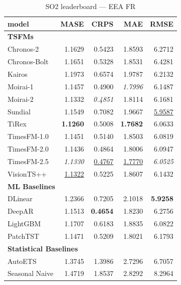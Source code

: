 \begin{table}[H]
\caption{SO2 leaderboard --- EEA FR}
\centering
\begin{small}
\begin{tabular}{lrrrr}
\toprule
model & MASE & CRPS & MAE & RMSE \\
\midrule
\multicolumn{5}{l}{\textbf{TSFMs}} \\
Chronos-2 & 1.1629 & 0.5423 & 1.8593 & 6.2712 \\
Chronos-Bolt & 1.1651 & 0.5328 & 1.8531 & 6.4281 \\
Kairos & 1.1973 & 0.6574 & 1.9787 & 6.2132 \\
Moirai-1 & 1.1457 & 0.4900 & \textit{1.7996} & 6.1487 \\
Moirai-2 & 1.1332 & \textit{0.4851} & 1.8114 & 6.1681 \\
Sundial & 1.1549 & 0.7082 & 1.9667 & \underline{5.9587} \\
TiRex & \textbf{1.1260} & 0.5008 & \textbf{1.7682} & 6.0633 \\
TimesFM-1.0 & 1.1451 & 0.5140 & 1.8503 & 6.0819 \\
TimesFM-2.0 & 1.1436 & 0.4864 & 1.8006 & 6.0947 \\
TimesFM-2.5 & \textit{1.1330} & \underline{0.4767} & \underline{1.7770} & \textit{6.0525} \\
VisionTS++ & \underline{1.1322} & 0.5225 & 1.8607 & 6.1432 \\
\midrule
\multicolumn{5}{l}{\textbf{ML Baselines}} \\
DLinear & 1.2366 & 0.7205 & 2.1018 & \textbf{5.9258} \\
DeepAR & 1.1513 & \textbf{0.4654} & 1.8230 & 6.2756 \\
LightGBM & 1.1707 & 0.6183 & 1.8835 & 6.0822 \\
PatchTST & 1.1471 & 0.5209 & 1.8021 & 6.1793 \\
\midrule
\multicolumn{5}{l}{\textbf{Statistical Baselines}} \\
AutoETS & 1.3745 & 1.3986 & 2.7296 & 6.7057 \\
Seasonal Naive & 1.4719 & 1.8537 & 2.8292 & 8.2964 \\
\bottomrule
\end{tabular}
\end{small}
\end{table}
